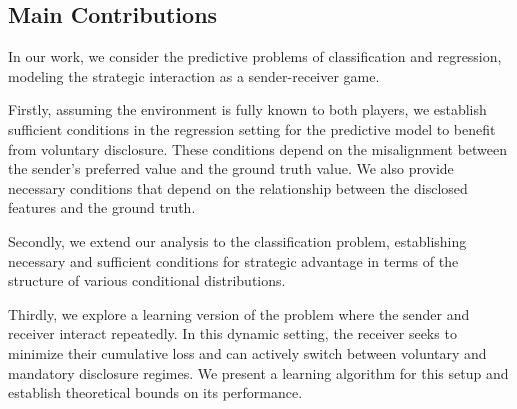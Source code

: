 \subsection{Main Contributions}

In our work, we consider the predictive problems of classification and regression, modeling the strategic interaction as a sender-receiver game. 

Firstly, assuming the environment is fully known to both players, we establish sufficient conditions in the regression setting for the predictive model to benefit from voluntary disclosure. These conditions depend on the misalignment between the sender's preferred value and the ground truth value. We also provide necessary conditions that depend on the relationship between the disclosed features and the ground truth. %

Secondly, we extend our analysis to the classification problem, establishing necessary and sufficient conditions for strategic advantage in terms of the structure of various conditional distributions.

Thirdly, we explore a learning version of the problem where the sender and receiver interact repeatedly. In this dynamic setting, the receiver seeks to minimize their cumulative loss and can actively switch between voluntary and mandatory disclosure regimes. We present a learning algorithm for this setup and establish theoretical bounds on its performance.
